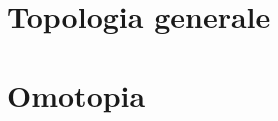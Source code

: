 \documentclass[a4paper, 11pt, twoside, openright, italian]{memoir}
\begin{document}
\frontmatter

%


\mainmatter

\part{Topologia generale}


\part{Omotopia}
%
%
%
%
%
%
%
%
%
%
%
%
%
%
%
%
%
%
%
%
%
%
\end{document}
